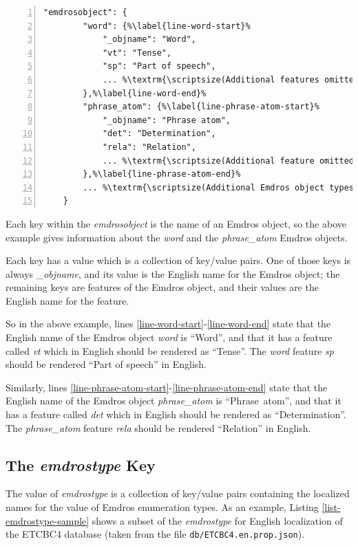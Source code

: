 \documentclass[11pt,oneside,a4paper]{memoir}
\begin{document}
\begin{lstlisting}[numbers=left,caption=A sample emdrosobject value,label=list-emdrosobject-sample]
    "emdrosobject": {
        "word": {%\label{line-word-start}%
            "_objname": "Word",
            "vt": "Tense",
            "sp": "Part of speech",
            ... %\textrm{\scriptsize(Additional features omitted)}%
        },%\label{line-word-end}%
        "phrase_atom": {%\label{line-phrase-atom-start}%
            "_objname": "Phrase atom",
            "det": "Determination",
            "rela": "Relation",
            ... %\textrm{\scriptsize(Additional feature omitted)}%
        },%\label{line-phrase-atom-end}%
        ... %\textrm{\scriptsize(Additional Emdros object types omitted)}%
    }
\end{lstlisting}


Each key within the \emph{emdrosobject} is the name of an Emdros object, so the above example gives
information about the \emph{word} and the \emph{phrase\_atom} Emdros objects.

Each key has a value which is a collection of key/value pairs. One of those keys is always
\emph{\_objname}, and its value is the English name for the Emdros object; the remaining keys are
features of the Emdros object, and their values are the English name for the feature.

So in the above example, lines \ref{line-word-start}-\ref{line-word-end} state that the English name
of the Emdros object \emph{word} is ``Word'', and that it has a feature called \emph{vt} which
in English should be rendered as ``Tense''. The \emph{word} feature \emph{sp} should be rendered
``Part of speech'' in English.

Similarly, lines \ref{line-phrase-atom-start}-\ref{line-phrase-atom-end} state that the English name
of the Emdros object \emph{phrase\_atom} is ``Phrase~atom'', and that it has a feature called
\emph{det} which in English should be rendered as ``Determination''. The \emph{phrase\_atom} feature
\emph{rela} should be rendered ``Relation'' in English.


\subsection{The \emph{emdrostype} Key}\label{enum-loc}

The value of \emph{emdrostype} is a collection of key/value pairs containing the localized names for
the value of Emdros enumeration types. As an example, Listing \ref{list-emdrostype-sample} shows
a subset of the \emph{emdrostype} for English localization of the ETCBC4 database (taken from the
file \texttt{db/ETCBC4.en.prop.json}).
\end{document}
